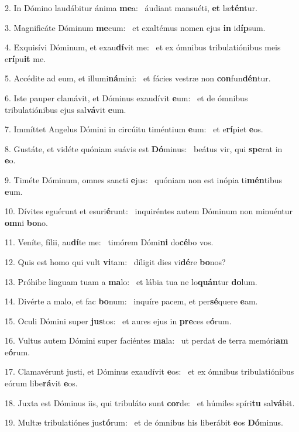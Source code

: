 2. In Dómino laudábitur ánima \textbf{me}a: \ast\  áudiant mansuéti, \textbf{et} læ\textbf{tén}tur.\

3. Magnificáte Dóminum \textbf{me}cum: \ast\  et exaltémus nomen ejus \textbf{in} id\textbf{íp}sum.\

4. Exquisívi Dóminum, et exau\textbf{dí}vit me: \ast\  et ex ómnibus tribulatiónibus meis e\textbf{rí}pu\textbf{it} me.\

5. Accédite ad eum, et illumi\textbf{ná}mini: \ast\  et fácies vestræ non \textbf{con}fun\textbf{dén}tur.\

6. Iste pauper clamávit, et Dóminus exaudívit \textbf{e}um: \ast\  et de ómnibus tribulatiónibus ejus sal\textbf{vá}vit \textbf{e}um.\

7. Immíttet Angelus Dómini in circúitu timéntium \textbf{e}um: \ast\  et e\textbf{rí}piet \textbf{e}os.\

8. Gustáte, et vidéte quóniam suávis est \textbf{Dó}minus: \ast\  beátus vir, qui \textbf{spe}rat in \textbf{e}o.\

9. Timéte Dóminum, omnes sancti \textbf{e}jus: \ast\  quóniam non est inópia ti\textbf{mén}tibus \textbf{e}um.\

10. Dívites eguérunt et esuri\textbf{é}runt: \ast\  inquiréntes autem Dóminum non minuéntur \textbf{om}ni \textbf{bo}no.\

11. Veníte, fílii, au\textbf{dí}te me: \ast\  timórem Dómi\textbf{ni} do\textbf{cé}bo vos.\

12. Quis est homo qui vult \textbf{vi}tam: \ast\  díligit dies vi\textbf{dé}re \textbf{bo}nos?\

13. Próhibe linguam tuam a \textbf{ma}lo: \ast\  et lábia tua ne lo\textbf{quán}tur \textbf{do}lum.\

14. Divérte a malo, et fac \textbf{bo}num: \ast\  inquíre pacem, et per\textbf{sé}quere \textbf{e}am.\

15. Oculi Dómini super \textbf{jus}tos: \ast\  et aures ejus in \textbf{pre}ces e\textbf{ó}rum.\

16. Vultus autem Dómini super faciéntes \textbf{ma}la: \ast\  ut perdat de terra memóri\textbf{am} e\textbf{ó}rum.\

17. Clamavérunt justi, et Dóminus exaudívit \textbf{e}os: \ast\  et ex ómnibus tribulatiónibus eórum libe\textbf{rá}vit \textbf{e}os.\

18. Juxta est Dóminus iis, qui tribuláto sunt \textbf{cor}de: \ast\  et húmiles spíri\textbf{tu} sal\textbf{vá}bit.\

19. Multæ tribulatiónes jus\textbf{tó}rum: \ast\  et de ómnibus his liberábit \textbf{e}os \textbf{Dó}minus.\

